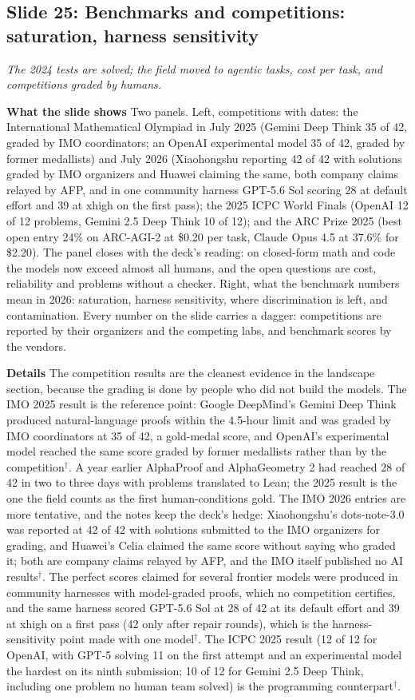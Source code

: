 \documentclass[11pt,letterpaper]{article}
\newcommand{\slide}[3]{%
  \subsection[Slide #1: #2]{Slide #1: #2}%
  {\color{muted}\itshape #3\par}\medskip}
\newcommand{\para}[1]{\medskip\noindent\textbf{#1}\quad}
\begin{document}
\slide{25}{Benchmarks and competitions: saturation, harness sensitivity}{The 2024 tests are solved; the field moved to agentic tasks, cost per task, and competitions graded by humans.}

\para{What the slide shows} Two panels. Left, competitions with dates: the International Mathematical Olympiad in July 2025 (Gemini Deep Think 35 of 42, graded by IMO coordinators; an OpenAI experimental model 35 of 42, graded by former medallists) and July 2026 (Xiaohongshu reporting 42 of 42 with solutions graded by IMO organizers and Huawei claiming the same, both company claims relayed by AFP, and in one community harness GPT-5.6 Sol scoring 28 at default effort and 39 at xhigh on the first pass); the 2025 ICPC World Finals (OpenAI 12 of 12 problems, Gemini 2.5 Deep Think 10 of 12); and the ARC Prize 2025 (best open entry 24\% on ARC-AGI-2 at \$0.20 per task, Claude Opus 4.5 at 37.6\% for \$2.20). The panel closes with the deck's reading: on closed-form math and code the models now exceed almost all humans, and the open questions are cost, reliability and problems without a checker. Right, what the benchmark numbers mean in 2026: saturation, harness sensitivity, where discrimination is left, and contamination. Every number on the slide carries a dagger: competitions are reported by their organizers and the competing labs, and benchmark scores by the vendors.

\para{Details} The competition results are the cleanest evidence in the landscape section, because the grading is done by people who did not build the models. The IMO 2025 result is the reference point: Google DeepMind's Gemini Deep Think produced natural-language proofs within the 4.5-hour limit and was graded by IMO coordinators at 35 of 42, a gold-medal score, and OpenAI's experimental model reached the same score graded by former medallists rather than by the competition$^\dagger$. A year earlier AlphaProof and AlphaGeometry 2 had reached 28 of 42 in two to three days with problems translated to Lean; the 2025 result is the one the field counts as the first human-conditions gold. The IMO 2026 entries are more tentative, and the notes keep the deck's hedge: Xiaohongshu's dots-note-3.0 was reported at 42 of 42 with solutions submitted to the IMO organizers for grading, and Huawei's Celia claimed the same score without saying who graded it; both are company claims relayed by AFP, and the IMO itself published no AI results$^\dagger$. The perfect scores claimed for several frontier models were produced in community harnesses with model-graded proofs, which no competition certifies, and the same harness scored GPT-5.6 Sol at 28 of 42 at its default effort and 39 at xhigh on a first pass (42 only after repair rounds), which is the harness-sensitivity point made with one model$^\dagger$. The ICPC 2025 result (12 of 12 for OpenAI, with GPT-5 solving 11 on the first attempt and an experimental model the hardest on its ninth submission; 10 of 12 for Gemini 2.5 Deep Think, including one problem no human team solved) is the programming counterpart$^\dagger$.
\end{document}
